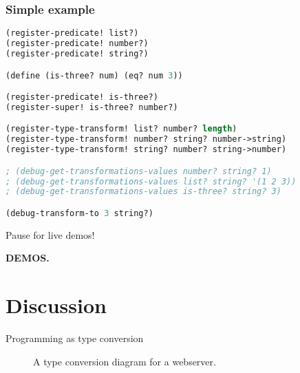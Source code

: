 \documentclass[11pt]{beamer}
\begin{document}
\begin{frame}[fragile]
\frametitle{Simple example}

\begin{lstlisting}[language=lisp]
(register-predicate! list?)
(register-predicate! number?)
(register-predicate! string?)

(define (is-three? num) (eq? num 3))

(register-predicate! is-three?)
(register-super! is-three? number?)

(register-type-transform! list? number? length)
(register-type-transform! number? string? number->string)
(register-type-transform! string? number? string->number)

; (debug-get-transformations-values number? string? 1)
; (debug-get-transformations-values list? string? '(1 2 3))
; (debug-get-transformations-values is-three? string? 3)

(debug-transform-to 3 string?)
\end{lstlisting}

\end{frame}

\begin{frame}{Pause for live demos!}

\begin{center} \Huge \textbf{DEMOS.} \end{center}

\end{frame}

\section{Discussion}

\begin{frame}{Programming as type conversion}
    \begin{figure}[h!]
        \centering

        \resizebox{10cm}{!} {
          
        }

        \caption{A type conversion diagram for a webserver.}
    \end{figure}
\end{frame}
\end{document}
